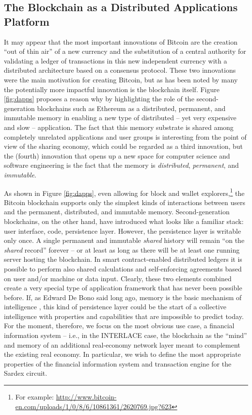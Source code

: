 \subsection{The Blockchain as a Distributed Applications Platform}
It may appear that the most important innovations of Bitcoin are the creation ``out of thin air'' of a new currency and the substitution of a central authority for validating a ledger of transactions in this new independent currency with a distributed architecture based on a consensus protocol. These two innovations were the main motivation for creating Bitcoin, but as has been noted by many the potentially more impactful innovation is the blockchain itself. Figure \ref{fig:dapps} proposes a reason why by highlighting the role of the second-generation blockchains such as Ethereum as a distributed, permanent, and immutable memory in enabling a new type of distributed -- yet very expensive and slow -- application. The fact that this memory substrate is shared among completely unrelated applications and user groups is interesting from the point of view of the sharing economy, which could be regarded as a third innovation, but the (fourth) innovation that opens up a new space for computer science and software engineering is the fact that the memory is \emph{distributed}, \emph{permanent}, and \emph{immutable}.

As shown in Figure \ref{fig:dapps}, even allowing for block and wallet explorers,\footnote{For example: \url{http://www.bitcoin-en.com/uploads/1/0/8/6/10861361/2620769.jpg?623}} the Bitcoin blockchain supports only the simplest kinds of interactions between users and the permanent, distributed, and immutable memory. Second-generation blockchains, on the other hand, have introduced what looks like a familiar stack: user interface, code, persistence layer. However, the persistence layer is writable only once. A single permanent and immutable \emph{shared} history will remain ``on the \emph{shared} record'' forever -- or at least as long as there will be at least one running server hosting the blockchain. In smart contract-enabled distributed ledgers it is possible to perform also shared calculations and self-enforcing agreements based on user and/or machine or data input. Clearly, these two elements combined create a very special type of application framework that has never been possible before. If, as Edward De Bono said long ago, memory is the basic mechanism of intelligence \cite{DeBono1969}, this kind of persistence layer could be the start of a collective intelligence with properties and capabilities that are impossible to predict today. For the moment, therefore, we focus on the most obvious use case, a financial information system -- i.e., in the INTERLACE case, the blockchain as the ``mind'' and memory of an additional real-economy network layer meant to complement the existing real economy. In particular, we wish to define the most appropriate properties of the financial information system and transaction engine for the Sardex circuit.

